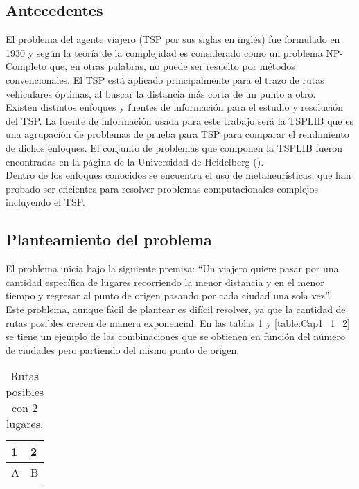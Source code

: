 \subsection{Antecedentes}
El problema del agente viajero (TSP por sus siglas en inglés) fue formulado en 1930 y según la teoría de la complejidad es considerado como un problema NP-Completo que, en otras palabras, no puede ser resuelto por métodos convencionales. El TSP está aplicado principalmente para el trazo de rutas vehiculares óptimas, al buscar la distancia más corta de un punto a otro.\\
\hspace*{1cm}Existen distintos enfoques y fuentes de información para el estudio y resolución del TSP. La fuente de información usada para este trabajo será la TSPLIB que es una agrupación de problemas de prueba para TSP para comparar el rendimiento de dichos enfoques. El conjunto de problemas que componen la TSPLIB fueron encontradas en la página de la Universidad de Heidelberg (\cite{[TSPLIB]}).\\
\hspace*{1cm}Dentro de los enfoques conocidos se encuentra el uso de metaheurísticas, que han probado ser eficientes para resolver problemas computacionales complejos incluyendo el TSP.\\

\subsection{Planteamiento del problema}
El problema inicia bajo la siguiente premisa: “Un viajero quiere pasar por una cantidad específica de lugares recorriendo la menor distancia y en el menor tiempo y regresar al punto de origen pasando por cada ciudad una sola vez”.\\ 
\hspace*{1cm}Este problema, aunque fácil de plantear es difícil resolver, ya que la cantidad de rutas posibles crecen de manera exponencial. En las tablas \ref {table:Cap1_1_1} y \ref {table:Cap1_1_2} se tiene un ejemplo de las combinaciones que se obtienen en función del número de ciudades pero partiendo del mismo punto de origen.
    
    \begin{table}[hbtp]
        \centering
        \caption{Rutas posibles con 2 lugares.}       
        \begin{tabular}{| l | l |  }
            \hline
             \rowcolor[gray]{0.9} 1  &  2 \\ \hline
             A  & B \\ \hline
        \end{tabular}
        \label{table:Cap1_1_1}
    \end{table}


